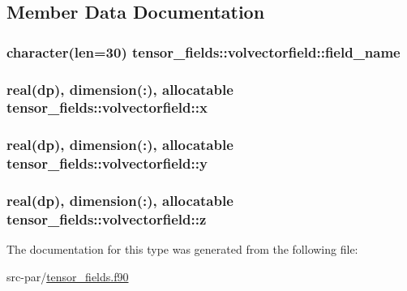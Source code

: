 \subsection{Member Data Documentation}
\hypertarget{structtensor__fields_1_1volvectorfield_aa5650124a4287704697a743007493597}{
\subsubsection[{field\-\_\-name}]{\setlength{\rightskip}{0pt plus 5cm}character(len=30) tensor\-\_\-fields\-::volvectorfield\-::field\-\_\-name}}\label{structtensor__fields_1_1volvectorfield_aa5650124a4287704697a743007493597}
\hypertarget{structtensor__fields_1_1volvectorfield_ae8ed0d16b6fab2c74f8b90d61e2d62e0}{
\subsubsection[{x}]{\setlength{\rightskip}{0pt plus 5cm}real(dp), dimension(\-:), allocatable tensor\-\_\-fields\-::volvectorfield\-::x}}\label{structtensor__fields_1_1volvectorfield_ae8ed0d16b6fab2c74f8b90d61e2d62e0}
\hypertarget{structtensor__fields_1_1volvectorfield_a06531f83731fd322e2d8be103b85f6bc}{
\subsubsection[{y}]{\setlength{\rightskip}{0pt plus 5cm}real(dp), dimension(\-:), allocatable tensor\-\_\-fields\-::volvectorfield\-::y}}\label{structtensor__fields_1_1volvectorfield_a06531f83731fd322e2d8be103b85f6bc}
\hypertarget{structtensor__fields_1_1volvectorfield_a08400888d02a55a3e4a82b2c94d71068}{
\subsubsection[{z}]{\setlength{\rightskip}{0pt plus 5cm}real(dp), dimension(\-:), allocatable tensor\-\_\-fields\-::volvectorfield\-::z}}\label{structtensor__fields_1_1volvectorfield_a08400888d02a55a3e4a82b2c94d71068}


The documentation for this type was generated from the following file\-:\begin{DoxyCompactItemize}
\item 
src-\/par/\hyperlink{tensor__fields_8f90}{tensor\-\_\-fields.\-f90}\end{DoxyCompactItemize}

